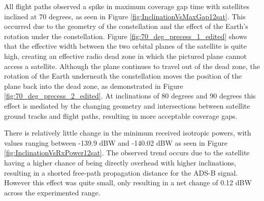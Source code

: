 All flight paths observed a spike in maximum coverage gap time with satellites inclined at 70 degrees, as seen in Figure \ref{fig:InclinationVsMaxGap12sat}. This occurred due to the geometry of the constellation and the effect of the Earth's rotation under the constellation. Figure \ref{fig:70_deg_precess_1_edited} shows that the effective width between the two orbital planes of the satellite is quite high, creating an effective radio dead zone in which the pictured plane cannot access a satellite. Although the plane continues to travel out of the dead zone, the rotation of the Earth underneath the constellation moves the position of the plane back into the dead zone, as demonstrated in  Figure \ref{fig:70_deg_precess_2_edited}. At inclinations of 80 degrees and 90 degrees this effect is mediated by the changing geometry and intersections between satellite ground tracks and flight paths, resulting in more acceptable coverage gaps.

There is relatively little change in the minimum received isotropic powers, with values ranging between -139.9 dBW and -140.02 dBW as seen in Figure \ref{fig:InclinationVsRxPower12sat}. The observed trend occurs due to the satellite having a higher chance of being directly overhead with higher inclinations, resulting in a shorted free-path propagation distance for the ADS-B signal. However this effect was quite small, only resulting in a net change of 0.12 dBW across the experimented range.

